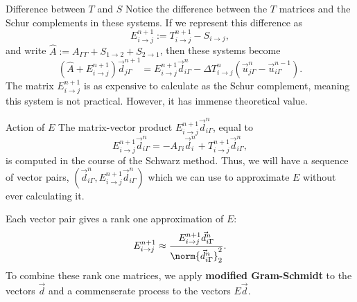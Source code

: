 \documentclass{beamer}
\begin{document}
\begin{frame}{Difference between $T$ and $S$}
Notice the difference between the $T$ matrices and the Schur complements in these systems.
If we represent this difference as
\begin{equation*}
	E_{i \to j}^{n+1} := T_{i \to j}^{n+1} - S_{i \to j},
\end{equation*}
and write $\hat{A} := A_{\Gamma \Gamma} + S_{1 \to 2} + S_{2 \to 1}$, then these systems become
\begin{equation*}
	\left ( \hat{A} + E_{i \to j}^{n+1} \right ) \vec{d}_{j \Gamma}^{n+1} = E_{i \to j}^{n+1} \vec{d}_{i \Gamma}^n - \Delta T_{i \to j}^n \left ( \vec{u}_{j \Gamma}^n - \vec{u}_{i \Gamma}^{n-1} \right ).
\end{equation*}
The matrix $E_{i \to j}^{n+1}$ is as expensive to calculate as the Schur complement, meaning this system is not practical.
However, it has immense theoretical value.
\end{frame}

\begin{frame}{Action of $E$}
The matrix-vector product $E_{i \to j}^{n+1} \vec{d}_{i \Gamma}^n$, equal to
\begin{equation*}
	E_{i \to j}^{n+1} \vec{d}_{i \Gamma}^n = -A_{\Gamma i} \vec{d}_i^n + T_{i \to j}^{n+1} \vec{d}_{i \Gamma}^n,
\end{equation*}
is computed in the course of the Schwarz method.
Thus, we will have a sequence of vector pairs, $\left ( \vec{d}_{i \Gamma}^n, E_{i \to j}^{n+1} \vec{d}_{i \Gamma}^n \right )$ which we can use to approximate $E$ without ever calculating it.

Each vector pair gives a rank one approximation of $E$:
\begin{equation*}
	E_{i \to j}^{n+1} \approx \frac{E_{i \to j}^{n+1} \vec{d}_{i \Gamma}^n}{\norm{\vec{d}_{i \Gamma}^n}_2^2}.
\end{equation*}
To combine these rank one matrices, we apply \textbf{modified Gram-Schmidt} to the vectors $\vec{d}$ and a commenserate process to the vectors $E \vec{d}$.
\end{frame}
\end{document}
